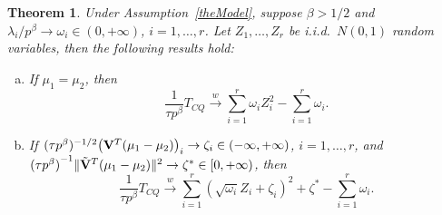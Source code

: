 \documentclass[review]{elsarticle}
\theoremstyle{plain}
\newtheorem{theorem}{\quad\quad Theorem}
\theoremstyle{definition}
\theoremstyle{remark}
\begin{document}
\begin{theorem}\label{Chenstheory2}
 Under Assumption~\ref{theModel},
    suppose $\beta>1/2$ and $\lambda_i/p^\beta \to \omega_i\in(0,+\infty)$, $i=1,\ldots,r$.
    Let $Z_1,\ldots,Z_{r}$ be i.i.d.\ $N(0,1)$ random variables,
     then the following results hold:
     \begin{enumerate}[(a)]
         \item
             If $\mu_1=\mu_2$, then
    $$
        \frac{1}{\tau p^{\beta}} T_{CQ}
        \xrightarrow{w}
        \sum_{i=1}^r \omega_i Z_i^2
            -
        \sum_{i=1}^r \omega_i.
    $$
         \item
             If $(\tau p^{\beta})^{-1/2}\big(\mathbf{V}^T (\mu_1-\mu_2)\big)_i\to \zeta_i\in(-\infty,+\infty)$, $i=1,\ldots,r$,
             and
    ${(\tau p^\beta)}^{-1}\|\tilde{\mathbf{V}}^T (\mu_1-\mu_2)\|^2\to \zeta^*\in [0,+\infty)$, then
    $$
        \frac{1}{\tau p^{\beta}} T_{CQ}
        \xrightarrow{w}
        \sum_{i=1}^r (\sqrt{\omega_i} Z_i+\zeta_i)^2+
\zeta^*
        -
        \sum_{i=1}^r \omega_i.
    $$
     \end{enumerate}
\end{theorem}
\end{document}
